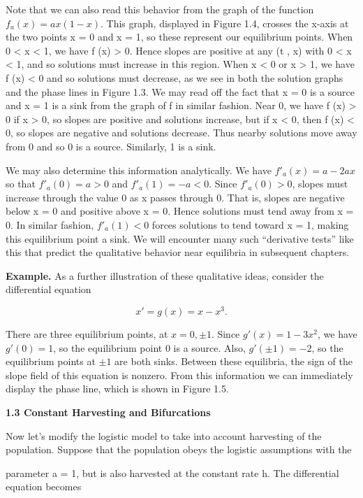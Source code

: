 \documentclass[12pt]{article}
\begin{document}
Note that we can also read this behavior from the graph of the function
$f_a(x) = ax(1 - x)$. This graph, displayed in Figure 1.4, crosses the x-axis at
the two points x = 0 and x = 1, so these represent our equilibrium points.
When 0 < x < 1, we have f (x) > 0. Hence slopes are positive at any (t , x)
with 0 < x < 1, and so solutions must increase in this region. When x < 0 or
x > 1, we have f (x) < 0 and so solutions must decrease, as we see in both the
solution graphs and the phase lines in Figure 1.3.
We may read off the fact that x = 0 is a source and x = 1 is a sink from
the graph of f in similar fashion. Near 0, we have f (x) > 0 if x > 0, so slopes
are positive and solutions increase, but if x < 0, then f (x) < 0, so slopes are
negative and solutions decrease. Thus nearby solutions move away from 0 and
so 0 is a source. Similarly, 1 is a sink.

We may also determine this information analytically. We have $f'_a(x)=a-2ax$ so that $f'_a(0) = a > 0$ and $f'_a(1) = -a < 0$. Since $f'_a(0) > 0$, slopes must increase through the value 0 as x passes through 0. That is, slopes are
negative below x = 0 and positive above x = 0. Hence solutions must tend
away from x = 0. In similar fashion, $f'_a(1) < 0$ forces solutions to tend toward
x = 1, making this equilibrium point a sink. We will encounter many such
“derivative tests” like this that predict the qualitative behavior near equilibria
in subsequent chapters.

\textbf{Example.} As a further illustration of these qualitative ideas, consider the
differential equation

\[
x' = g (x) = x - x^3.
\]


There are three equilibrium points, at $x = 0, \pm 1$. Since $g'(x) = 1 - 3x^2$, we have $g'(0) = 1$, so the equilibrium point 0 is a source.
Also, $g'(\pm 1) = -2$, so the equilibrium points at $\pm 1$ are both sinks. 
Between these equilibria, the sign of the slope field of this equation is nonzero. 
From this information we can immediately display the phase line, which is shown in Figure 1.5.

\hfill

\textbf{1.3 Constant Harvesting and
Bifurcations}

\hfill

Now let’s modify the logistic model to take into account harvesting of the population.
Suppose that the population obeys the logistic assumptions with the

parameter a = 1, but is also harvested at the constant rate h. The differential
equation becomes
\end{document}
